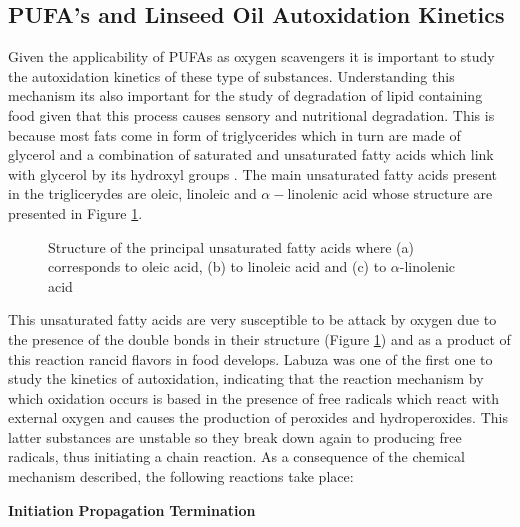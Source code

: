 \begin{refsection}
\section{PUFA's and Linseed Oil Autoxidation Kinetics}\label{sec:Linseed_Oxid.}
Given the applicability of PUFAs as oxygen scavengers it is important to study the autoxidation kinetics of these type of substances. Understanding this mechanism its also important for the study of degradation of lipid containing food given that this process causes sensory and nutritional degradation. This is because most fats come in form of triglycerides which in turn are made of glycerol and a combination of saturated and unsaturated fatty acids which link with glycerol by its hydroxyl groups \cite{Labuza1971KineticsFoods}. The main unsaturated fatty acids present in the triglicerydes are oleic, linoleic and $\alpha-$linolenic acid whose structure are presented in Figure \ref{fig:estructura_pufa}. 


\begin{figure}[!ht]
\centering
{}


\caption{Structure of the principal unsaturated fatty acids where (a) corresponds to oleic acid, (b) to linoleic acid and (c) to $\alpha$-linolenic acid}
\label{fig:estructura_pufa}
\end{figure}

This unsaturated fatty acids are very susceptible to be attack by oxygen due to the presence of the double bonds in their structure (Figure \ref{fig:estructura_pufa}) and as a product of this reaction rancid flavors in food develops. Labuza \cite{Labuza1971KineticsFoods} was one of the first one to study the kinetics of autoxidation,  indicating that the reaction mechanism by which oxidation occurs is based in the presence of free radicals which react with external oxygen and causes the production of peroxides and hydroperoxides. This latter substances are unstable so they break down again to producing free radicals, thus initiating a chain reaction.  As a consequence of the chemical mechanism described,  the following reactions take place:
\begin{center}
    \textbf{Initiation }
    \textbf{Propagation }
    \textbf{Termination}
\end{center}


\end{refsection}
